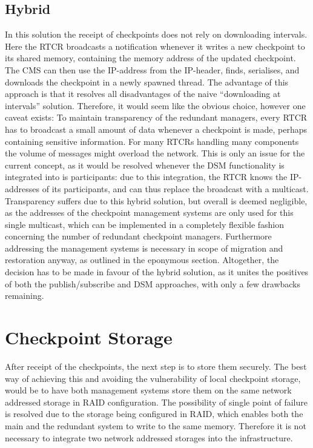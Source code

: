 \subsection{Hybrid}
In this solution the receipt of checkpoints does not rely on downloading intervals. Here the RTCR broadcasts a notification whenever it writes a new checkpoint to its shared memory, containing the memory address of the updated checkpoint. The CMS can then use the IP-address from the IP-header, finds, serialises, and downloads the checkpoint in a newly spawned thread. The advantage of this approach is that it resolves all disadvantages of the naive “downloading at intervals” solution. Therefore, it would seem like the obvious choice, however one caveat exists: To maintain transparency of the redundant managers, every RTCR has to broadcast a small amount of data whenever a checkpoint is made, perhaps containing sensitive information. For many RTCRs handling many components the volume of messages might overload the network. This is only an issue for the current concept, as it would be resolved whenever the DSM functionality is integrated into is participants: due to this integration, the RTCR knows the IP-addresses of its participants, and can thus replace the broadcast with a multicast. Transparency suffers due to this hybrid solution, but overall is deemed negligible, as the addresses of the checkpoint management systems are only used for this single multicast, which can be implemented in a completely flexible fashion concerning the number of redundant checkpoint managers. Furthermore addressing the management systems is necessary in scope of migration and restoration anyway, as outlined in the eponymous section. 
\newline \newline
Altogether, the decision has to be made in favour of the hybrid solution, as it unites the positives of both the publish/subscribe and DSM approaches, with only a few drawbacks remaining.
\section{Checkpoint Storage}
After receipt of the checkpoints, the next step is to store them securely. The best way of achieving this and avoiding the vulnerability of local checkpoint storage, would be to have both management systems store them on the same network addressed storage in RAID configuration. The possibility of single point of failure is resolved due to the storage being configured in RAID, which enables both the main and the redundant system to write to the same memory. Therefore it is not necessary to integrate two network addressed storages into the infrastructure.

